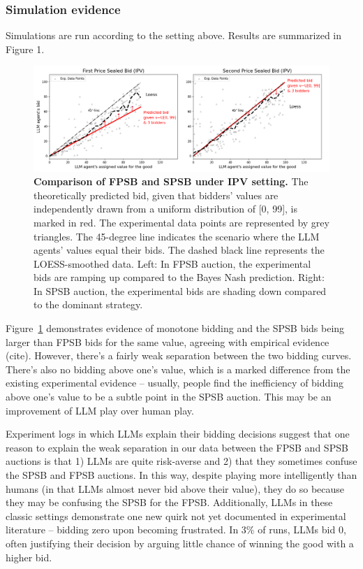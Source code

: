 \documentclass{article} %
\begin{document}
\subsubsection{Simulation evidence}
Simulations are run according to the setting above. Results are summarized in Figure 1.


\begin{figure}[h]
    \centering \includegraphics[width=\linewidth]{Figs/ipv.png}
    \caption{\textbf{ Comparison of FPSB and SPSB under IPV setting.} The theoretically predicted bid, given that bidders' values are independently drawn from a uniform distribution of [0, 99], is marked in red. The experimental data points are represented by grey triangles. The 45-degree line indicates the scenario where the LLM agents' values equal their bids. The dashed black line represents the LOESS-smoothed data. Left: In FPSB auction, the experimental bids are ramping up compared to the Bayes Nash prediction. Right: In SPSB auction, the experimental bids are shading down compared to the dominant strategy.}
    \label{fig:fpsb}

\end{figure}

Figure~\ref{fig:fpsb} demonstrates evidence of monotone bidding and the SPSB bids being larger than FPSB bids for the same value, agreeing with empirical evidence (cite). However, there's a fairly weak separation between the two bidding curves. There's also no bidding above one's value, which is a marked difference from the existing experimental evidence -- usually, people find the inefficiency of bidding above one's value to be a subtle point in the SPSB auction. This may be an improvement of LLM play over human play. 

Experiment logs in which LLMs explain their bidding decisions suggest that one reason to explain the weak separation in our data between the FPSB and SPSB auctions is that 1) LLMs are quite risk-averse and 2) that they sometimes confuse the SPSB and FPSB auctions. In this way, despite playing more intelligently than humans (in that LLMs almost never bid above their value), they do so because they may be confusing the SPSB for the FPSB. Additionally, LLMs in these classic settings demonstrate one new quirk not yet documented in experimental literature -- bidding zero upon becoming frustrated. In 3\% of runs, LLMs bid $0$, often justifying their decision by arguing little chance of winning the good with a higher bid. 
\end{document}
